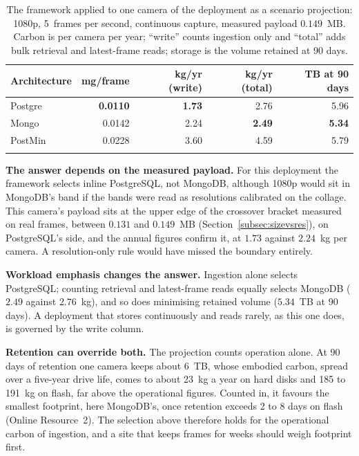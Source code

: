 \documentclass[pdflatex,sn-basic]{sn-jnl}%
\begin{document}
\begin{table}[htbp]
\caption{The framework applied to one camera of the deployment as a scenario projection: 1080p, 5~frames per second, continuous capture, measured payload $0.149$~MB. Carbon is per camera per year; ``write'' counts ingestion only and ``total'' adds bulk retrieval and latest-frame reads; storage is the volume retained at 90 days.}\label{tab:applied}
\small
\begin{tabular}{@{}lrrrr@{}}
\toprule
Architecture & mg/frame & kg/yr (write) & kg/yr (total) & TB at 90 days \\
\midrule
Postgre & \textbf{0.0110} & \textbf{1.73} & 2.76 & 5.96 \\
Mongo   & 0.0142 & 2.24 & \textbf{2.49} & \textbf{5.34} \\
PostMin & 0.0228 & 3.60 & 4.59 & 5.79 \\
\botrule
\end{tabular}
\end{table}

\textbf{The answer depends on the measured payload.} For this deployment the framework selects inline PostgreSQL, not MongoDB, although 1080p would sit in MongoDB's band if the bands were read as resolutions calibrated on the collage. This camera's payload sits at the upper edge of the crossover bracket measured on real frames, between $0.131$ and $0.149$~MB (Section~\ref{subsec:sizevsres}), on PostgreSQL's side, and the annual figures confirm it, at $1.73$ against $2.24$~kg per camera. A resolution-only rule would have missed the boundary entirely.

\textbf{Workload emphasis changes the answer.} Ingestion alone selects PostgreSQL; counting retrieval and latest-frame reads equally selects MongoDB ($2.49$ against $2.76$~kg), and so does minimising retained volume ($5.34$~TB at 90 days). A deployment that stores continuously and reads rarely, as this one does, is governed by the write column.

\textbf{Retention can override both.} The projection counts operation alone. At 90 days of retention one camera keeps about 6~TB, whose embodied carbon, spread over a five-year drive life, comes to about 23~kg a year on hard disks and 185 to 191~kg on flash, far above the operational figures. Counted in, it favours the smallest footprint, here MongoDB's, once retention exceeds 2 to 8 days on flash (Online Resource~2). The selection above therefore holds for the operational carbon of ingestion, and a site that keeps frames for weeks should weigh footprint first.
\end{document}
